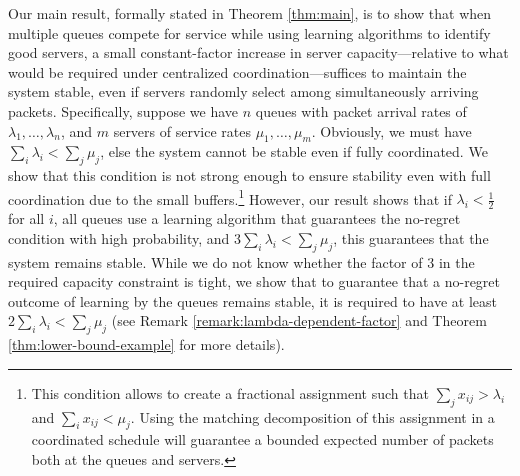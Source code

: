 Our main result, formally stated in Theorem \ref{thm:main}, is to show that 
when multiple queues compete for service while using learning algorithms to identify good servers, a small constant-factor increase in server capacity---relative to what would be required under centralized coordination---suffices to maintain the system stable, even if servers randomly select among simultaneously arriving packets.
Specifically, suppose we have $n$ queues with packet arrival rates of $\lambda_1,\ldots,\lambda_n$, and $m$ servers of service rates $\mu_1,\ldots,\mu_m$. Obviously, we must have $\sum_i\lambda_i < \sum_j \mu_j$, else the system cannot be stable even if fully coordinated. We show that this condition is not strong enough to ensure stability even with full coordination due to the small buffers.\footnote{This condition allows to create a fractional assignment such that $\sum_j x_{ij} >\lambda_i$ and $\sum_i x_{ij}<\mu_j$. Using the matching decomposition of this assignment in a coordinated schedule will guarantee a bounded expected number of packets both at the queues and servers.}  However, our result shows that if $\lambda_i<\frac12$ for all $i$, all queues use a learning algorithm that guarantees the no-regret condition with high probability, and  $3\sum_i\lambda_i < \sum_j \mu_j$, this guarantees that the system remains stable. While we do not know whether the factor of 3 in the required capacity constraint is tight, we show that to guarantee that a no-regret outcome of learning by the queues remains stable, it is required to have at least $2\sum_i\lambda_i < \sum_j \mu_j$  (see Remark \ref{remark:lambda-dependent-factor} and Theorem \ref{thm:lower-bound-example} for more details).